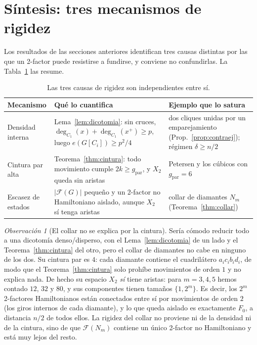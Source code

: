 \documentclass[11pt,a4paper]{article}
\theoremstyle{definition}
\theoremstyle{remark}
\newtheorem{observacion}[teorema]{Observación}
\begin{document}
\section{Síntesis: tres mecanismos de rigidez}\label{sec:sintesis}

Los resultados de las secciones anteriores identifican tres causas distintas por las que un 2-factor puede resistirse a fundirse, y conviene no confundirlas. La Tabla~\ref{tab:mecanismos} las resume.

\begin{table}[h]
\centering
\begin{tabular}{p{3.6cm}p{4.6cm}p{4.4cm}}
\toprule
Mecanismo & Qué lo cuantifica & Ejemplo que lo satura\\
\midrule
Densidad interna & Lema~\ref{lem:dicotomia}: sin cruces, $\deg_{C_1}(x)+\deg_{C_1}(x^+)\ge p$, luego $e(G[C_i])\ge p^2/4$ & dos cliques unidas por un emparejamiento (Prop.~\ref{prop:contraej}); régimen $\delta\ge n/2$\\[4pt]
Cintura par alta & Teorema~\ref{thm:cintura}: todo movimiento cumple $2k\ge g_{\mathrm{par}}$, y $X_2$ queda sin aristas & Petersen y los cúbicos con $g_{\mathrm{par}}=6$\\[4pt]
Escasez de estados & $|\mathcal{F}(G)|$ pequeño y un 2-factor no Hamiltoniano aislado, aunque $X_2$ sí tenga aristas & collar de diamantes $N_m$ (Teorema~\ref{thm:collar})\\
\bottomrule
\end{tabular}
\caption{Las tres causas de rigidez son independientes entre sí.}\label{tab:mecanismos}
\end{table}

\begin{observacion}[El collar no se explica por la cintura]\label{obs:tresmecanismos}
Sería cómodo reducir todo a una dicotomía denso/disperso, con el Lema~\ref{lem:dicotomia} de un lado y el Teorema~\ref{thm:cintura} del otro, pero el collar de diamantes no cabe en ninguno de los dos. Su cintura par es $4$: cada diamante contiene el cuadrilátero $a_ic_ib_id_i$, de modo que el Teorema~\ref{thm:cintura} solo prohíbe movimientos de orden $1$ y no explica nada. De hecho su espacio $X_2$ \emph{sí} tiene aristas: para $m=3,4,5$ hemos contado $12$, $32$ y $80$, y sus componentes tienen tamaños $\{1,2^m\}$. Es decir, los $2^m$ 2-factores Hamiltonianos están conectados entre sí por movimientos de orden $2$ (los giros internos de cada diamante), y lo que queda aislado es exactamente $F_0$, a distancia $n/2$ de todos ellos. La rigidez del collar no proviene ni de la densidad ni de la cintura, sino de que $\mathcal{F}(N_m)$ contiene un único 2-factor no Hamiltoniano y está muy lejos del resto.
\end{observacion}
\end{document}
